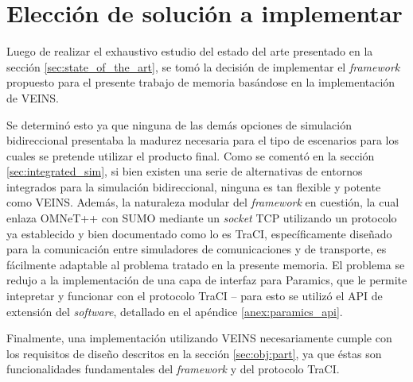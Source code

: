 \section{Elección de solución a implementar}\label{sec:solution}

Luego de realizar el exhaustivo estudio del estado del arte presentado en la sección \ref{sec:state_of_the_art}, se tomó la decisión de implementar el \emph{framework} propuesto para el presente trabajo de memoria basándose en la implementación de VEINS. 

Se determinó esto ya que ninguna de las demás opciones de simulación bidireccional presentaba la madurez necesaria para el tipo de escenarios para los cuales se pretende utilizar el producto final. Como se comentó en la sección \ref{sec:integrated_sim}, si bien existen una serie de alternativas de entornos integrados para la simulación bidireccional, ninguna es tan flexible y potente como VEINS. Además, la naturaleza modular del \emph{framework} en cuestión, la cual enlaza OMNeT++ con SUMO mediante un \emph{socket} TCP utilizando un protocolo ya establecido y bien documentado como lo es TraCI, específicamente diseñado para la comunicación entre simuladores de comunicaciones y de transporte, es fácilmente adaptable al problema tratado en la presente memoria. El problema se redujo a la implementación de una capa de interfaz para Paramics, que le permite intepretar y funcionar con el protocolo TraCI -- para esto se utilizó el API de extensión del \emph{software}, detallado en el apéndice \ref{anex:paramics_api}.

Finalmente, una implementación utilizando VEINS necesariamente cumple con los requisitos de diseño descritos en la sección \ref{sec:obj:part}, ya que éstas son funcionalidades fundamentales del \emph{framework} y del protocolo TraCI.